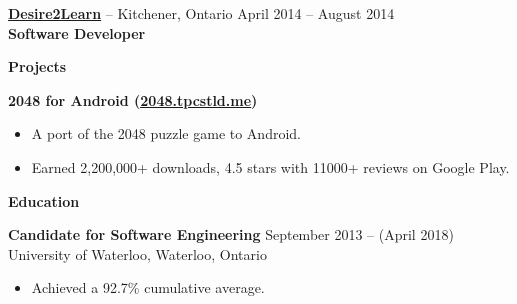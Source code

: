 \documentclass{letter}
\begin{document}
\vspace{-1.5mm}
{\bfseries \href{http://www.d2l.com}{\uline{Desire2Learn}}} -- Kitchener, Ontario \hfill April 2014 -- August 2014 \\
{\bfseries Software Developer}

{\bfseries \Large Projects}

\vspace{-10mm}
\null\hrulefill

\vspace{-1.5mm}
{\bfseries 2048 for Android (\href{http://2048.tpcstld.me}{\uline{2048.tpcstld.me}})}
\vspace{-3mm}
\begin{itemize}
    \item A port of the 2048 puzzle game to Android.
    \item Earned 2,200,000+ downloads, 4.5 stars with 11000+ reviews on Google
      Play.
\end{itemize}

{\bfseries \Large Education}

\vspace{-10mm}
\null\hrulefill

\vspace{-1.5mm}
{\bfseries Candidate for Software Engineering} \hfill September 2013 -- (April 2018)\\
University of Waterloo, Waterloo, Ontario
\vspace{-3mm}
\begin{itemize}
    \item Achieved a 92.7\% cumulative average.
\end{itemize}
\end{document}
